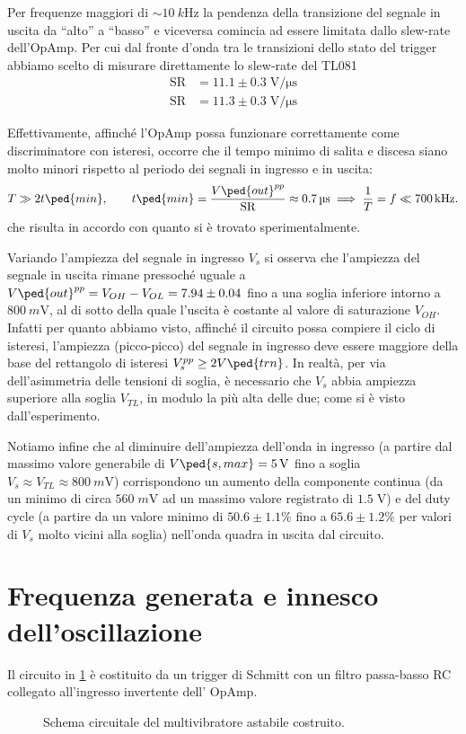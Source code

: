 \documentclass[10pt, a4paper, italian]{article}
\begin{document}
Per frequenze maggiori di $\sim \SI{10}{k\Hz}$ la pendenza della transizione
del segnale in uscita da ``alto'' a ``basso'' e viceversa comincia ad essere
limitata dallo slew-rate dell'OpAmp.
Per cui dal fronte d'onda tra le transizioni dello stato del trigger abbiamo
scelto di misurare direttamente lo slew-rate del TL081
\begin{align*}
\mathrm{SR} &= 11.1 \pm 0.3 \; \si{\V/\micro\s} \\
\mathrm{SR} &= 11.3 \pm 0.3 \; \si{\V/\micro\s}
\end{align*}

Effettivamente, affinché l'OpAmp possa funzionare correttamente come
discriminatore con isteresi, occorre che il tempo minimo di salita e discesa
siano molto minori rispetto al periodo dei segnali in ingresso e in uscita:
\begin{equation}\label{eq: slewlim}
T \gg 2 t\ped{min}, \qquad t\ped{min} =
\frac{V\ped{out}^{pp}}{\mathrm{SR}} \approx \SI{0.7}{\micro\s}
\implies \frac{1}{T} = f \ll \SI{700}{k\Hz}.
\end{equation}
che risulta in accordo con quanto si è trovato sperimentalmente.

Variando l'ampiezza del segnale in ingresso $V_s$ si osserva che l'ampiezza del
segnale in uscita rimane pressoché uguale a $V\ped{out}^{pp} = V_{OH} - V_{OL}
= 7.94 \pm 0.04$ fino a una soglia inferiore intorno a $\SI{800}{m\V}$, al di
sotto della quale l'uscita è costante al valore di saturazione $V_{OH}$.
Infatti per quanto abbiamo visto, affinché il circuito possa compiere il ciclo
di isteresi, l'ampiezza (picco-picco) del segnale in ingresso deve essere
maggiore della base del rettangolo di isteresi $V_s^{pp} \geq 2 V\ped{trn}$.
In realtà, per via dell'asimmetria delle tensioni di soglia, è necessario
che $V_s$ abbia ampiezza superiore alla soglia $V_{TL}$, in modulo la
più alta delle due; come si è visto dall'esperimento.

Notiamo infine che al diminuire dell'ampiezza dell'onda in ingresso (a partire
dal massimo valore generabile di $V\ped{s, max} = \SI{5}{\V}$ fino a soglia
$V_s \approx V_{TL} \approx \SI{800}{m\V}$)
corrispondono un aumento della componente continua (da un minimo di circa
$560 \; \si{m\V}$ ad un massimo valore registrato di $1.5 \; \si{\V}$) e del
duty cycle (a partire da un valore minimo di $50.6 \pm 1.1 \%$ fino a
$65.6 \pm 1.2 \%$ per valori di $V_s$ molto vicini alla soglia) nell'onda
quadra in uscita dal circuito.

\section{Frequenza generata e innesco dell'oscillazione}
Il circuito in \cref{fig: astableschm} è costituito da un trigger di
Schmitt con un filtro passa-basso RC collegato all'ingresso invertente dell'
OpAmp.
\begin{figure}[htbp]
    \centering
    \caption{Schema circuitale del multivibratore astabile costruito.
    \label{fig: astableschm}}
\end{figure}
\end{document}
